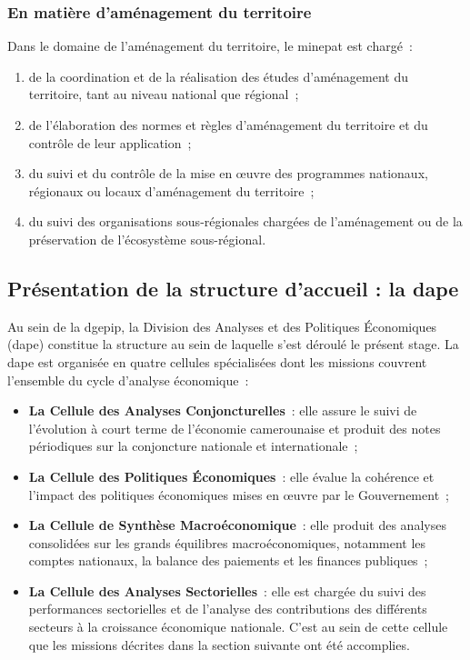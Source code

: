 \documentclass[12pt, a4paper, oneside]{report}
\begin{document}
\subsubsection{En matière d'aménagement du territoire}

Dans le domaine de l'aménagement du territoire, le \gls{minepat} est chargé~:
\begin{enumerate}
	\item de la coordination et de la réalisation des études d'aménagement du territoire,
	tant au niveau national que régional~;
	\item de l'élaboration des normes et règles d'aménagement du territoire et du
	contrôle de leur application~;
	\item du suivi et du contrôle de la mise en \oe uvre des programmes nationaux,
	régionaux ou locaux d'aménagement du territoire~;
	\item du suivi des organisations sous-régionales chargées de l'aménagement ou de
	la préservation de l'écosystème sous-régional.
\end{enumerate}

\subsection{Présentation de la structure d'accueil : la \gls{dape}}

Au sein de la \gls{dgepip}, la Division des Analyses et des Politiques Économiques (\gls{dape})
constitue la structure au sein de laquelle s'est déroulé le présent stage. La \gls{dape} est
organisée en quatre cellules spécialisées dont les missions couvrent l'ensemble du
cycle d'analyse économique~:

\begin{itemize}
	\item \textbf{La Cellule des Analyses Conjoncturelles}~: elle assure le suivi de
	l'évolution à court terme de l'économie camerounaise et produit des notes
	périodiques sur la conjoncture nationale et internationale~;
	\item \textbf{La Cellule des Politiques Économiques}~: elle évalue la cohérence et
	l'impact des politiques économiques mises en \oe uvre par le Gouvernement~;
	\item \textbf{La Cellule de Synthèse Macroéconomique}~: elle produit des analyses
	consolidées sur les grands équilibres macroéconomiques, notamment les comptes
	nationaux, la balance des paiements et les finances publiques~;
	\item \textbf{La Cellule des Analyses Sectorielles}~: elle est chargée du suivi des
	performances sectorielles et de l'analyse des contributions des différents
	secteurs à la croissance économique nationale. C'est au sein de cette cellule
	que les missions décrites dans la section suivante ont été accomplies.
\end{itemize}
	
\end{document}
